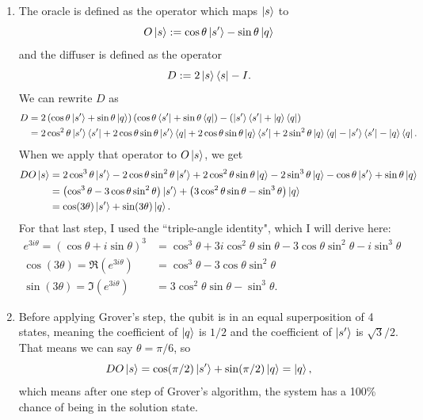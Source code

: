 \documentclass{article}
\begin{document}
\bigskip
\begin{prob}
\end{prob}
\begin{enumerate}[label=(\alph*)]
    \item The oracle is defined as the operator which maps $\left\lvert s \right\rangle$ to
        \[ O \left\lvert s \right\rangle := \cos\theta \left\lvert s' \right\rangle - \sin\theta \left\lvert q \right\rangle \]
        and the diffuser is defined as the operator
        \[ D := 2 \left\lvert s \right\rangle\left\langle s \right\rvert - I. \]
        We can rewrite $D$ as \begin{align*}
            D &= 2 \left( \cos\theta \left\lvert s' \right\rangle + \sin\theta \left\lvert q \right\rangle \right) \left( \cos\theta \left\langle s' \right\rvert + \sin\theta \left\langle q \right\rvert \right) - (\left\lvert s' \right\rangle\left\langle s' \right\rvert + \left\lvert q \right\rangle\left\langle q \right\rvert) \\
              &= 2 \cos^2\theta \left\lvert s' \right\rangle\left\langle s' \right\rvert+2\cos\theta \sin\theta \left\lvert s' \right\rangle\left\langle q \right\rvert + 2\cos\theta\sin\theta\left\lvert q \right\rangle\left\langle s' \right\rvert+2\sin^2\theta\left\lvert q \right\rangle\left\langle q \right\rvert-\left\lvert s' \right\rangle\left\langle s' \right\rvert-\left\lvert q \right\rangle\left\langle q \right\rvert.
        \end{align*}
        When we apply that operator to $O\left\lvert s \right\rangle$, we get \begin{align*}
            DO\left\lvert s \right\rangle &= 2\cos^3\theta\left\lvert s' \right\rangle-2\cos\theta\sin^2\theta\left\lvert s' \right\rangle+2\cos^2\theta\sin\theta\left\lvert q \right\rangle-2\sin^3\theta\left\lvert q \right\rangle-\cos\theta\left\lvert s' \right\rangle+\sin\theta\left\lvert q \right\rangle \\
                      &= \left( \cos^3\theta -3\cos\theta\sin^2\theta \right) \left\lvert s' \right\rangle + \left( 3\cos^2\theta\sin\theta-\sin^3\theta \right) \left\lvert q \right\rangle \\
                      &= \cos(3\theta) \left\lvert s' \right\rangle + \sin(3\theta) \left\lvert q \right\rangle.
        \end{align*}
        For that last step, I used the ``triple-angle identity", which I will derive here:
        \begin{align*}
            e^{3i\theta} = \left( \cos\theta + i \sin\theta \right)^3 &= \cos^3\theta +3i\cos^2\theta\sin\theta-3\cos\theta\sin^2\theta-i\sin^3\theta \\
            \cos(3\theta) = \Re(e^{3i\theta}) &= \cos^3\theta -3\cos\theta\sin^2\theta \\
            \sin(3\theta) = \Im(e^{3i\theta}) &= 3\cos^2\theta\sin\theta - \sin^3\theta.
        \end{align*}
    \item Before applying Grover's step, the qubit is in an equal superposition of 4 states, meaning the coefficient of $\left\lvert q \right\rangle$ is $1/2$ and the coefficient of $\left\lvert s' \right\rangle$ is $\sqrt{3}/2$. That means we can say $\theta = \pi/6$, so
        \[ DO\left\lvert s \right\rangle = \cos(\pi/2)\left\lvert s' \right\rangle+\sin(\pi/2)\left\lvert q \right\rangle = \left\lvert q \right\rangle, \]
        which means after one step of Grover's algorithm, the system has a 100\% chance of being in the solution state.
\end{enumerate}



\end{document}
